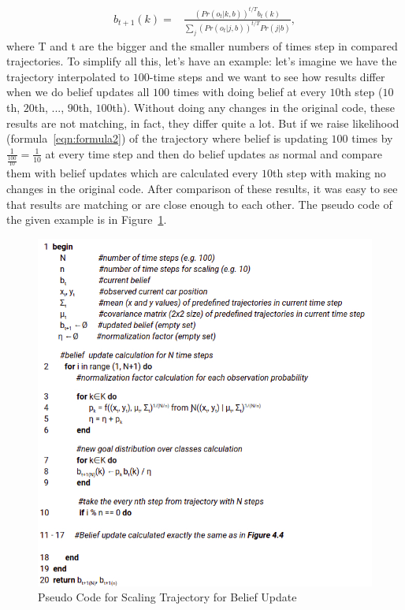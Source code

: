 \begin{equation}
\begin{split}
b_{t+1}(k) = & \displaystyle \frac{(Pr(o_{t}|k, b))^{t/T} b_{t}(k)}{ \sum_{j} (Pr(o_{t}|j, b))^{t/T} Pr(j|b)}, 
\end{split}
\label{eqn:formula5}
\end{equation}
where T and t are the bigger and the smaller numbers of times step in compared trajectories.
To simplify all this, let's have an example: let's imagine we have the trajectory interpolated to $100$-time steps and we want to see how results differ when we do belief updates all $100$ times with doing belief at every $10$th step ($10$th, $20$th, ..., $90$th, $100$th). Without doing any changes in the original code, these results are not matching, in fact, they differ quite a lot. But if we raise likelihood (formula~\ref{eqn:formula2}) of the trajectory where belief is updating $100$ times by $\frac{1}{\frac{100}{10}} = \frac{1}{10}$ at every time step and then do belief updates as normal and compare them with belief updates which are calculated every $10$th step with making no changes in the original code. After comparison of these results, it was easy to see that results are matching or are close enough to each other. The pseudo code of the given example is in Figure~\ref{fig:PseudoScalling}.

\begin{figure}[H]
	\centering  	
	\includegraphics[width=13cm]{img/Pseudo4Scalling.jpg}
	\caption{Pseudo Code for Scaling Trajectory for Belief Update}
	\label{fig:PseudoScalling}    
\end{figure}

